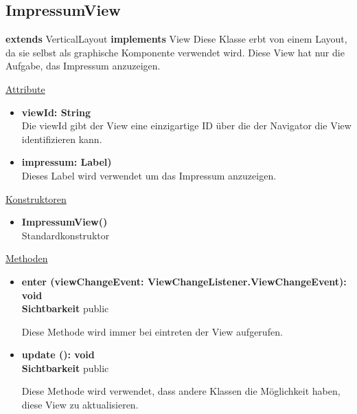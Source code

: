 \newpage
\subsection{ImpressumView}\label{ImpressumView}
\textbf{extends}  VerticalLayout \newline
\textbf{implements} View \newline
Diese Klasse erbt von einem Layout, da sie selbst als graphische Komponente verwendet wird. Diese View hat nur die Aufgabe, das Impressum anzuzeigen.
\newline

\underline{Attribute}
\begin{itemize}
\itemsep0pt
\item \textbf{viewId: String} \hfill\\ 
Die viewId gibt der View eine einzigartige ID über die der Navigator die View identifizieren kann.

\item \textbf{impressum: Label)} \hfill\\ 
Dieses Label wird verwendet um das Impressum anzuzeigen.

\end{itemize}

\underline{Konstruktoren}
\begin{itemize}
\itemsep0pt
\item \textbf{ImpressumView()} \hfill\\
Standardkonstruktor
\end{itemize}

\underline{Methoden}
\begin{itemize}
\itemsep0pt
\item \textbf{enter (viewChangeEvent: ViewChangeListener.ViewChangeEvent): void}\hfill\\
\textbf{Sichtbarkeit} public

Diese Methode wird immer bei eintreten der View aufgerufen.

\item \textbf{update (): void}\hfill\\
\textbf{Sichtbarkeit} public

Diese Methode wird verwendet, dass andere Klassen die Möglichkeit haben, diese View zu aktualisieren.

\end{itemize}
